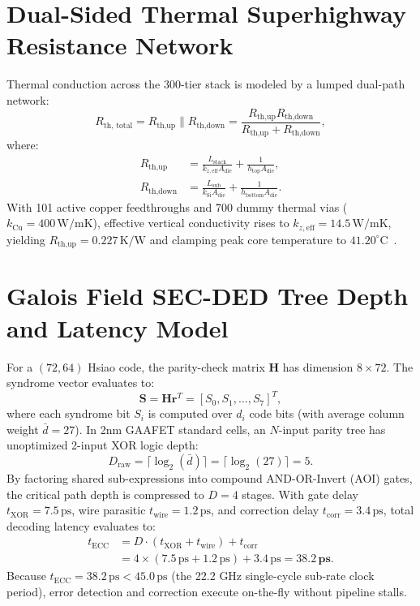 \documentclass[journal]{IEEEtran}
\begin{document}
\section{Dual-Sided Thermal Superhighway Resistance Network}
Thermal conduction across the 300-tier stack is modeled by a lumped dual-path network:
\begin{equation}
    R_{\text{th, total}} = R_{\text{th,up}} \parallel R_{\text{th,down}} = \frac{R_{\text{th,up}} R_{\text{th,down}}}{R_{\text{th,up}} + R_{\text{th,down}}},
\end{equation}
where:
\begin{align}
    R_{\text{th,up}} &= \frac{L_{\text{stack}}}{k_{z, \text{eff}} A_{\text{die}}} + \frac{1}{h_{\text{top}} A_{\text{die}}}, \\
    R_{\text{th,down}} &= \frac{L_{\text{sub}}}{k_{\text{Si}} A_{\text{die}}} + \frac{1}{h_{\text{bottom}} A_{\text{die}}}.
\end{align}
With 101 active copper feedthroughs and 700 dummy thermal vias ($k_{\text{Cu}} = 400\,\text{W/mK}$), effective vertical conductivity rises to $k_{z, \text{eff}} = 14.5\,\text{W/mK}$, yielding $R_{\text{th,up}} = 0.227\,\text{K/W}$ and clamping peak core temperature to $41.20^\circ\text{C}$~\cite{omi_sim_report}.

\section{Galois Field SEC-DED Tree Depth and Latency Model}
For a $(72, 64)$ Hsiao code, the parity-check matrix $\mathbf{H}$ has dimension $8 \times 72$. The syndrome vector evaluates to:
\begin{equation}
    \mathbf{S} = \mathbf{H} \mathbf{r}^T = [S_0, S_1, \dots, S_7]^T,
\end{equation}
where each syndrome bit $S_i$ is computed over $d_i$ code bits (with average column weight $\bar{d} = 27$). In 2nm GAAFET standard cells, an $N$-input parity tree has unoptimized 2-input XOR logic depth:
\begin{equation}
    D_{\text{raw}} = \lceil \log_2(\bar{d}) \rceil = \lceil \log_2(27) \rceil = 5.
\end{equation}
By factoring shared sub-expressions into compound AND-OR-Invert (AOI) gates, the critical path depth is compressed to $D = 4$ stages. With gate delay $t_{\text{XOR}} = 7.5\,\text{ps}$, wire parasitic $t_{\text{wire}} = 1.2\,\text{ps}$, and correction delay $t_{\text{corr}} = 3.4\,\text{ps}$, total decoding latency evaluates to:
\begin{align}
    t_{\text{ECC}} &= D \cdot (t_{\text{XOR}} + t_{\text{wire}}) + t_{\text{corr}} \nonumber \\
    &= 4 \times (7.5\,\text{ps} + 1.2\,\text{ps}) + 3.4\,\text{ps} = \mathbf{38.2\,\text{ps}}.
\end{align}
Because $t_{\text{ECC}} = 38.2\,\text{ps} < 45.0\,\text{ps}$ (the 22.2 GHz single-cycle sub-rate clock period), error detection and correction execute on-the-fly without pipeline stalls.
\end{document}
